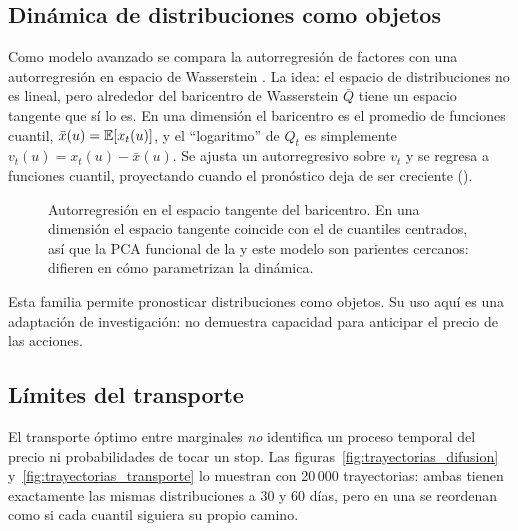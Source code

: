 

\subsection{Dinámica de distribuciones como objetos}\label{sec:war}

Como modelo avanzado se compara la autorregresión de factores con una autorregresión en espacio de
Wasserstein \citep{zhang2022}. La idea: el espacio de distribuciones no es lineal, pero alrededor del
baricentro de Wasserstein $\bar Q$ tiene un espacio tangente que sí lo es. En una dimensión el baricentro
es el promedio de funciones cuantil, $\bar x(u)=\mathbb{E}[x_t(u)]$, y el ``logaritmo'' de $Q_t$ es simplemente
$v_t(u)=x_t(u)-\bar x(u)$. Se ajusta un autorregresivo sobre $v_t$ y se regresa a funciones cuantil,
proyectando cuando el pronóstico deja de ser creciente ().

\begin{figure}[H]
\centering
\resizebox{0.86\linewidth}{!}{}
\caption{Autorregresión en el espacio tangente del baricentro. En una dimensión el espacio tangente
coincide con el de cuantiles centrados, así que la PCA funcional de la  y este modelo son
parientes cercanos: difieren en cómo parametrizan la dinámica.}
\label{fig:tangente}
\end{figure}

Esta familia permite pronosticar distribuciones como objetos. Su uso aquí es una adaptación de
investigación: no demuestra capacidad para anticipar el precio de las acciones.

\subsection{Límites del transporte}\label{sec:limites}

El transporte óptimo entre marginales \emph{no} identifica un proceso temporal del precio ni probabilidades
de tocar un stop. Las figuras~\ref{fig:trayectorias_difusion} y~\ref{fig:trayectorias_transporte} lo
muestran con 20\,000 trayectorias: ambas tienen exactamente las mismas distribuciones a 30 y 60 días, pero
en una se reordenan como si cada cuantil siguiera su propio camino.

